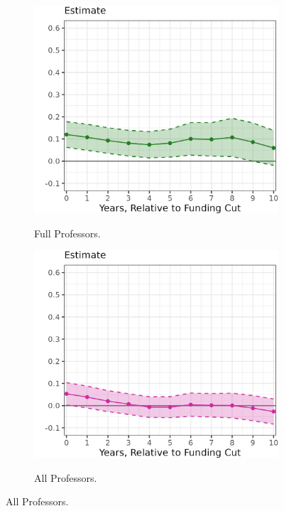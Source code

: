 \begin{figure}[h!]
\begin{subfigure}[b]{0.495\textwidth}
        \label{fig:assistant-count-lp}
    \end{subfigure}
    \begin{subfigure}[b]{0.495\textwidth}
        \centering
        \caption{Full Professors.}
        \includegraphics[width=\textwidth]{figures/full-count-lp.png}
        \label{fig:full-count-lp}
    \end{subfigure}
    \begin{subfigure}[b]{0.495\textwidth}
        \centering
        \caption{All Professors.}
        \includegraphics[width=\textwidth]{figures/all-count-lp.png}
        \label{fig:all-count-lp}
    \end{subfigure}
    \label{fig:count-lp}
\end{figure}

